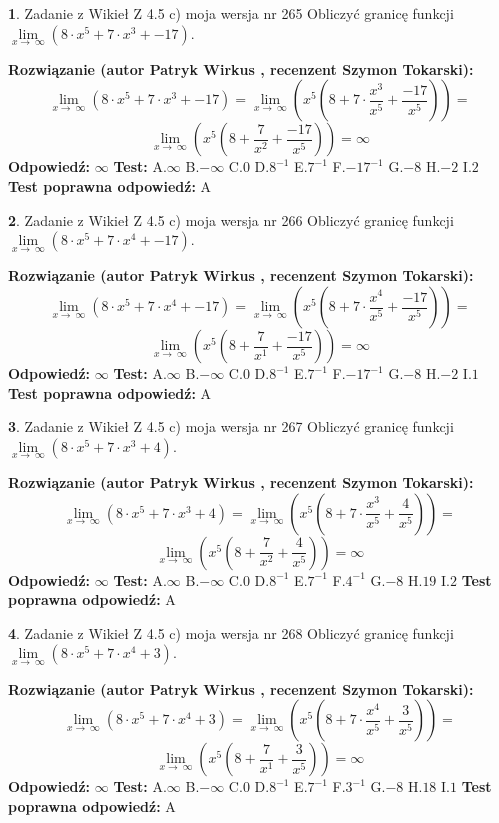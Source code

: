 \documentclass[12pt, a4paper]{article}
\theoremstyle{definition} %
\newtheorem{zad}{}
\newcommand{\zadStart}[1]{\begin{zad}#1\newline}
\newcommand{\zadStop}{\end{zad}}
\newcommand{\rozwStart}[2]{\noindent \textbf{Rozwiązanie (autor #1 , recenzent #2): }\newline}
\newcommand{\rozwStop}{\newline}
\newcommand{\odpStart}{\noindent \textbf{Odpowiedź:}\newline}
\newcommand{\odpStop}{\newline}
\newcommand{\testStart}{\noindent \textbf{Test:}\newline}
\newcommand{\testStop}{\newline}
\newcommand{\kluczStart}{\noindent \textbf{Test poprawna odpowiedź:}\newline}
\newcommand{\kluczStop}{\newline}
\begin{document}
\zadStart{Zadanie z Wikieł Z 4.5 c) moja wersja nr 265}
Obliczyć granicę funkcji  $\lim\limits_{x\to\ \infty}(8 \cdot x^{5}+7 \cdot x^{3}+-17)$.
\zadStop
\rozwStart{Patryk Wirkus}{Szymon Tokarski}
$$\lim\limits_{x\to\ \infty}(8 \cdot x^{5}+7 \cdot x^{3}+-17) = \lim\limits_{x\to\ \infty}(x^{5}(8 +7 \cdot \frac{x^{3}}{x^{5}}+\frac{-17}{x^{5}})) =$$ $$\lim\limits_{x\to\ \infty}(x^{5}(8 +\frac{7}{x^{2}}+\frac{-17}{x^{5}})) =\infty$$
\rozwStop
\odpStart
$\infty$
\odpStop
\testStart
A.$\infty$ B.$-\infty$ C.$0$ D.$8^{-1}$ E.$7^{-1}$
F.$-17^{-1}$ G.$-8$
H.$-2$
I.$2$
\testStop
\kluczStart
A
\kluczStop



\zadStart{Zadanie z Wikieł Z 4.5 c) moja wersja nr 266}
Obliczyć granicę funkcji  $\lim\limits_{x\to\ \infty}(8 \cdot x^{5}+7 \cdot x^{4}+-17)$.
\zadStop
\rozwStart{Patryk Wirkus}{Szymon Tokarski}
$$\lim\limits_{x\to\ \infty}(8 \cdot x^{5}+7 \cdot x^{4}+-17) = \lim\limits_{x\to\ \infty}(x^{5}(8 +7 \cdot \frac{x^{4}}{x^{5}}+\frac{-17}{x^{5}})) =$$ $$\lim\limits_{x\to\ \infty}(x^{5}(8 +\frac{7}{x^{1}}+\frac{-17}{x^{5}})) =\infty$$
\rozwStop
\odpStart
$\infty$
\odpStop
\testStart
A.$\infty$ B.$-\infty$ C.$0$ D.$8^{-1}$ E.$7^{-1}$
F.$-17^{-1}$ G.$-8$
H.$-2$
I.$1$
\testStop
\kluczStart
A
\kluczStop



\zadStart{Zadanie z Wikieł Z 4.5 c) moja wersja nr 267}
Obliczyć granicę funkcji  $\lim\limits_{x\to\ \infty}(8 \cdot x^{5}+7 \cdot x^{3}+4)$.
\zadStop
\rozwStart{Patryk Wirkus}{Szymon Tokarski}
$$\lim\limits_{x\to\ \infty}(8 \cdot x^{5}+7 \cdot x^{3}+4) = \lim\limits_{x\to\ \infty}(x^{5}(8 +7 \cdot \frac{x^{3}}{x^{5}}+\frac{4}{x^{5}})) =$$ $$\lim\limits_{x\to\ \infty}(x^{5}(8 +\frac{7}{x^{2}}+\frac{4}{x^{5}})) =\infty$$
\rozwStop
\odpStart
$\infty$
\odpStop
\testStart
A.$\infty$ B.$-\infty$ C.$0$ D.$8^{-1}$ E.$7^{-1}$
F.$4^{-1}$ G.$-8$
H.$19$
I.$2$
\testStop
\kluczStart
A
\kluczStop



\zadStart{Zadanie z Wikieł Z 4.5 c) moja wersja nr 268}
Obliczyć granicę funkcji  $\lim\limits_{x\to\ \infty}(8 \cdot x^{5}+7 \cdot x^{4}+3)$.
\zadStop
\rozwStart{Patryk Wirkus}{Szymon Tokarski}
$$\lim\limits_{x\to\ \infty}(8 \cdot x^{5}+7 \cdot x^{4}+3) = \lim\limits_{x\to\ \infty}(x^{5}(8 +7 \cdot \frac{x^{4}}{x^{5}}+\frac{3}{x^{5}})) =$$ $$\lim\limits_{x\to\ \infty}(x^{5}(8 +\frac{7}{x^{1}}+\frac{3}{x^{5}})) =\infty$$
\rozwStop
\odpStart
$\infty$
\odpStop
\testStart
A.$\infty$ B.$-\infty$ C.$0$ D.$8^{-1}$ E.$7^{-1}$
F.$3^{-1}$ G.$-8$
H.$18$
I.$1$
\testStop
\kluczStart
A
\kluczStop
\end{document}
